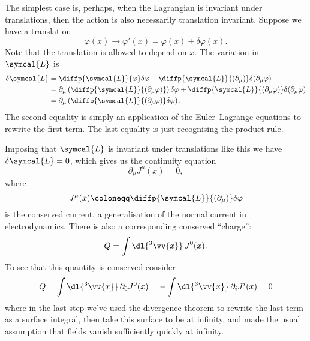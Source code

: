 \documentclass[fleqn]{NotesClass}
\newcommand{\lagrangianDensity}{\symcal{L}}
\begin{document}
    The simplest case is, perhaps, when the Lagrangian is invariant under translations, then the action is also necessarily translation invariant.
    Suppose we have a translation
    \begin{equation}
        \varphi(x) \to \varphi'(x) = \varphi(x) + \delta \varphi(x).
    \end{equation}
    Note that the translation is allowed to depend on \(x\).
    The variation in \(\lagrangianDensity\) is
    \begin{align}
        \delta \lagrangianDensity &= \diffp{\lagrangianDensity}{\varphi} \delta\varphi + \diffp{\lagrangianDensity}{(\partial_\mu)} \delta(\partial_\mu \varphi)\\
        &= \partial_\mu \left( \diffp{\lagrangianDensity}{(\partial_\mu\varphi)} \right) \delta \varphi + \diffp{\lagrangianDensity}{(\partial_\mu\varphi)} \delta(\partial_\mu\varphi)\\
        &= \partial_\mu\left( \diffp{\lagrangianDensity}{(\partial_\mu \varphi)} \delta \varphi \right).
    \end{align}
    The second equality is simply an application of the Euler--Lagrange equations to rewrite the first term.
    The last equality is just recognising the product rule.
    
    Imposing that \(\lagrangianDensity\) is invariant under translations like this we have \(\delta \lagrangianDensity = 0\), which gives us the continuity equation
    \begin{equation}
        \partial_\mu J^\mu(x) = 0,
    \end{equation}
    where
    \begin{equation}
        J^\mu(x) \coloneqq \diffp{\lagrangianDensity}{(\partial_\mu)} \delta \varphi
    \end{equation}
    is the conserved current, a generalisation of the normal current in electrodynamics.
    There is also a corresponding conserved \enquote{charge}:
    \begin{equation}
        Q = \int\dl{^3\vv{x}} \, J^0(x).
    \end{equation}
    To see that this quantity is conserved consider
    \begin{equation}
        \dot{Q} = \int \dl{^3\vv{x}} \, \partial_0 J^0(x) = -\int \dl{^3\vv{x}} \, \partial_i J^i(x) = 0
    \end{equation}
    where in the last step we've used the divergence theorem to rewrite the last term as a surface integral, then take this surface to be at infinity, and made the usual assumption that fields vanish sufficiently quickly at infinity.
    
\end{document}
